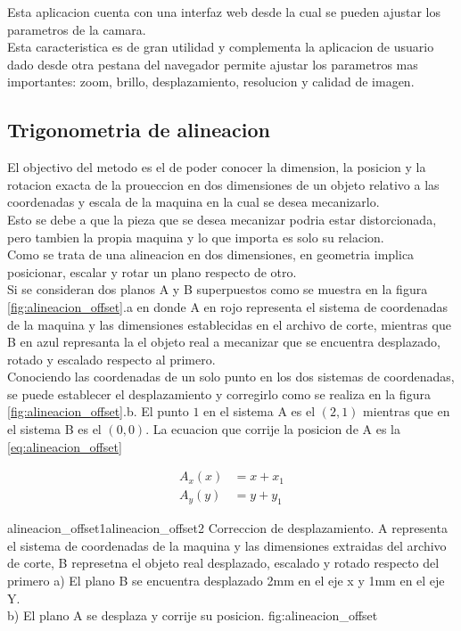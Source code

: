   Esta aplicacion cuenta con una interfaz web desde la cual se pueden ajustar los parametros de la camara.\\
  Esta caracteristica es de gran utilidad y complementa la aplicacion de usuario dado desde otra pestana del navegador permite ajustar los parametros mas importantes: zoom, brillo, desplazamiento, resolucion y calidad de imagen.\\


\subsection{Trigonometria de alineacion}

   El objectivo del metodo es el de poder conocer la dimension, la posicion y la rotacion exacta de la proueccion en dos dimensiones de un objeto relativo a las coordenadas y escala de la maquina en la cual se desea mecanizarlo. \\
Esto se debe a que la pieza que se desea mecanizar podria estar distorcionada, pero tambien la propia maquina y lo que importa es solo su relacion. \\
   Como se trata de una alineacion en dos dimensiones, en geometria implica posicionar, escalar y rotar un plano respecto de otro.\\
   Si se consideran dos planos A y B superpuestos como se muestra en la figura \ref{fig:alineacion_offset}.a en donde A en rojo representa el sistema de coordenadas de la maquina y las dimensiones establecidas en el archivo de corte, mientras que B en azul represanta la el objeto real a mecanizar que se encuentra desplazado, rotado y escalado respecto al primero. \\
   Conociendo las coordenadas de un solo punto en los dos sistemas de coordenadas, se puede establecer el desplazamiento y corregirlo como se realiza en la figura \ref{fig:alineacion_offset}.b. El punto $1$ en el sistema A es el $(2,1)$ mientras que en el sistema B es el $(0,0)$.
   La ecuacion que corrije la posicion de A es la \ref{eq:alineacion_offset}

   \begin{equation}
      \begin{aligned}
         A_x(x) &= x+x_1 \\
         A_y(y) &= y+y_1
      \end{aligned}
      \label{eq:alineacion_offset}
   \end{equation}

         {alineacion_offset1}{alineacion_offset2}
         {Correccion de desplazamiento. A representa el sistema de coordenadas de la maquina y las dimensiones extraidas del archivo de corte, B represetna el objeto real desplazado, escalado y rotado respecto del primero a) El plano B se encuentra desplazado 2mm en el eje x y 1mm en el eje Y.\\ b) El plano A se desplaza y corrije su posicion.}
         {fig:alineacion_offset}

